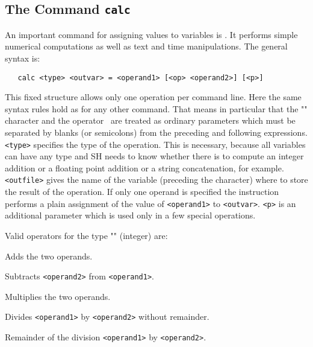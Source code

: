 \subsection{The Command {\tt calc}}

An important command for assigning values to variables is .
It performs simple numerical computations as well as text and time
manipulations.  The general syntax is:
\begin{verbatim}
   calc <type> <outvar> = <operand1> [<op> <operand2>] [<p>]
\end{verbatim}
This fixed structure allows only one operation per command line.
Here the same syntax rules hold as for any other command.  That
means in particular that the "\cmd{=}" character and the operator
\ are treated as ordinary parameters which must be
separated by blanks (or semicolons) from the preceding and following
expressions.  \verb+<type>+ specifies the type of the operation.
This is necessary, because all variables can have any type and
SH needs to know whether there is to compute an integer addition
or a floating point addition or a string concatenation, for example.
\verb+<outfile>+ gives the name of the variable (preceding the
\exm{\&} character) where to store the result of the operation.
If only one operand is specified the instruction performs a plain
assignment of the value of \verb+<operand1>+ to \verb+<outvar>+.
\verb+<p>+ is an additional parameter which is used only in a
few special operations.
\bigskip

\noindent
Valid operators for the type "" (integer) are:
\begin{deflist}{}
\item[\exm{+}]
   Adds the two operands.
\item[\exm{-}]
   Subtracts \verb+<operand2>+ from \verb+<operand1>+.
\item[\exm{*}]
   Multiplies the two operands.
\item[\exm{div}]
   Divides \verb+<operand1>+ by \verb+<operand2>+ without remainder.
\item[\exm{mod}]
   Remainder of the division \verb+<operand1>+ by \verb+<operand2>+.
\end{deflist}
\bigskip

